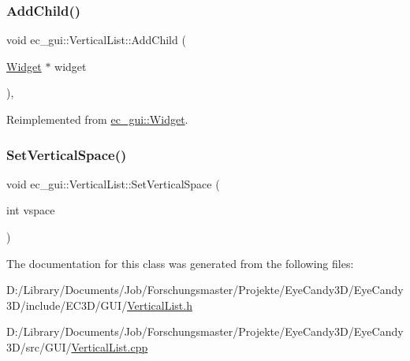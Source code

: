 \subsubsection{\texorpdfstring{Add\+Child()}{AddChild()}}
{\footnotesize\ttfamily void ec\+\_\+gui\+::\+Vertical\+List\+::\+Add\+Child (\begin{DoxyParamCaption}\item[{\mbox{\hyperlink{classec__gui_1_1_widget}{Widget}} $\ast$}]{widget }\end{DoxyParamCaption})\hspace{0.3cm}{\ttfamily [override]}, {\ttfamily [virtual]}}



Reimplemented from \mbox{\hyperlink{classec__gui_1_1_widget_ac6e916b4ca37bff9ef9167eab55062f6}{ec\+\_\+gui\+::\+Widget}}.

\mbox{\label{classec__gui_1_1_vertical_list_ab7b23229f0082d66d5880cb24d63fc51}} 
\subsubsection{\texorpdfstring{Set\+Vertical\+Space()}{SetVerticalSpace()}}
{\footnotesize\ttfamily void ec\+\_\+gui\+::\+Vertical\+List\+::\+Set\+Vertical\+Space (\begin{DoxyParamCaption}\item[{int}]{vspace }\end{DoxyParamCaption})}



The documentation for this class was generated from the following files\+:\begin{DoxyCompactItemize}
\item 
D\+:/\+Library/\+Documents/\+Job/\+Forschungsmaster/\+Projekte/\+Eye\+Candy3\+D/\+Eye\+Candy3\+D/include/\+E\+C3\+D/\+G\+U\+I/\mbox{\hyperlink{_vertical_list_8h}{Vertical\+List.\+h}}\item 
D\+:/\+Library/\+Documents/\+Job/\+Forschungsmaster/\+Projekte/\+Eye\+Candy3\+D/\+Eye\+Candy3\+D/src/\+G\+U\+I/\mbox{\hyperlink{_vertical_list_8cpp}{Vertical\+List.\+cpp}}\end{DoxyCompactItemize}
